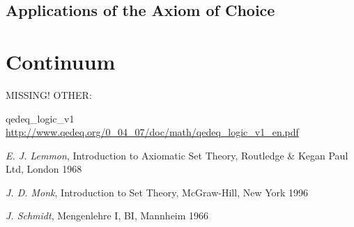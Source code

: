 \documentclass[a4paper,german,10pt,twoside]{book}
\theoremstyle{definition}
\theoremstyle{remark}
\begin{document}
\section{Applications of the Axiom of Choice} \label{chapter7_section2} \hypertarget{chapter7_section2}{}




\chapter{Continuum} \label{chapter8} \hypertarget{chapter8}{}

MISSING! OTHER: 


\backmatter

\begin{thebibliography}{99}


 qedeq\_logic\_v1 \url{http://www.qedeq.org/0_04_07/doc/math/qedeq_logic_v1_en.pdf}



 \emph{E. J. Lemmon}, Introduction to Axiomatic Set Theory, Routledge \& Kegan Paul Ltd, London 1968

 \emph{J. D. Monk}, Introduction to Set Theory, McGraw-Hill, New York 1996

 \emph{J. Schmidt}, Mengenlehre I, BI, Mannheim 1966

\end{thebibliography}
 \printindex
\end{document}
